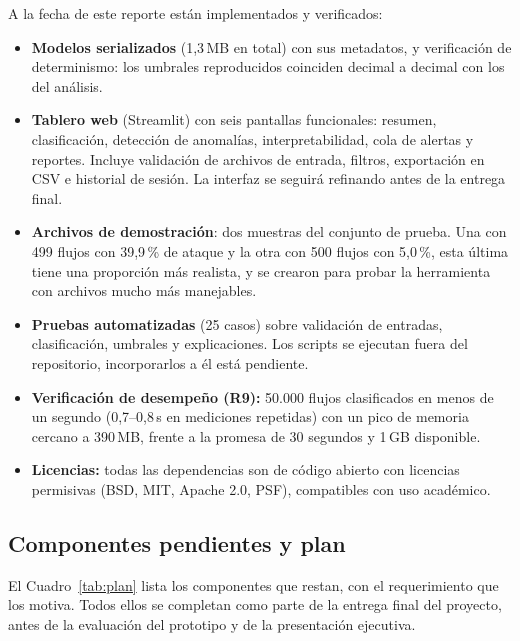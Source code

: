 \documentclass[11pt,a4paper]{article}
\begin{document}
A la fecha de este reporte están implementados y verificados:

\begin{itemize}
\item \textbf{Modelos serializados} (1,3\,MB en total) con sus metadatos, y
verificación de determinismo: los umbrales reproducidos coinciden decimal a
decimal con los del análisis.
\item \textbf{Tablero web} (Streamlit) con seis pantallas funcionales:
resumen, clasificación, detección de anomalías, interpretabilidad, cola de
alertas y reportes. Incluye validación de archivos de entrada, filtros,
exportación en CSV e historial de sesión. La interfaz se seguirá refinando
antes de la entrega final.
\item \textbf{Archivos de demostración}: dos muestras del conjunto de prueba.
Una con 499 flujos con 39,9\,\% de ataque y la otra con 500 flujos con 5,0\,\%, esta última tiene una proporción más realista, y se crearon para probar la herramienta con archivos mucho más manejables.
\item \textbf{Pruebas automatizadas} (25 casos) sobre validación de entradas,
clasificación, umbrales y explicaciones. Los scripts se ejecutan fuera del
repositorio, incorporarlos a él está pendiente.
\item \textbf{Verificación de desempeño (R9):} 50.000 flujos clasificados en
menos de un segundo (0,7--0,8\,s en mediciones repetidas) con un pico de
memoria cercano a 390\,MB, frente a la promesa de 30 segundos y 1\,GB
disponible.
\item \textbf{Licencias:} todas las dependencias son de código abierto
con licencias permisivas (BSD, MIT, Apache 2.0, PSF), compatibles con uso
académico.
\end{itemize}

\subsection{Componentes pendientes y plan}

El Cuadro~\ref{tab:plan} lista los componentes que restan, con el
requerimiento que los motiva. Todos ellos se completan como parte de la
entrega final del proyecto, antes de la evaluación del prototipo y de la
presentación ejecutiva.
\end{document}

